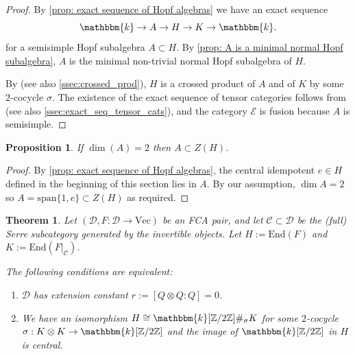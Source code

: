 \documentclass{amsart}
\theoremstyle{plain}%
\newtheorem{thm}[lemma]{Theorem}
\newtheorem{prop}[lemma]{Proposition}
\theoremstyle{remark}
\newcommand{\C}{\mathcal{C}}
\newcommand{\1}{\mathbbm{1}}
\newcommand{\D}{\mathcal{D}}
\newcommand{\E}{\mathcal{E}}
\newcommand{\Z}{\mathbb{Z}}
\newcommand{\End}{\mathrm{End}}
\newcommand{\Vect}{\mathrm{Vec}}
\newcommand{\kk}{\mathbbm{k}}
\newcommand{\pic}{\mathrm{Pic}}
\begin{document}
    \begin{proof}
        By \cref{prop: exact sequence of Hopf algebras} we have an exact sequence 
        $$
            \kk \to A\to H\to K\to \kk.
        $$
        for a semisimple Hopf subalgebra $A\subset H$. By \cref{prop: A is a minimal normal Hopf subalgebra}, $A$ is the minimal non-trivial normal Hopf subalgebra of $H$.
        
        By \cite{Sch} (see also \cref{ssec:crossed_prod}), $H$ is a crossed product of $A$ and of $K$ by some $2$-cocycle $\sigma$. The existence of the exact sequence of tensor categories follows from \cite{BN} (see also \cref{ssec:exact_seq_tensor_cats}), and the category $\E$ is fusion because $A$ is semisimple.
    \end{proof}
    \begin{prop}\label{prop: A is central when dim(A)=2}
        If $\dim(A) = 2$ then $A\subset Z(H)$.
    \end{prop}
    \begin{proof}
        By \cref{prop: exact sequence of Hopf algebras}, the central idempotent $e\in H$ defined in the beginning of this section lies in $A$. By our assumption, $\dim A=2$ so $A = \mathrm{span}\{1,e\}\subset Z(H)$ as required. 
    \end{proof}
    \begin{thm}\label{thm: integral almost semisimple with r=0}
        Let $(\D,F:\D\to \Vect)$ be an FCA pair, and let $\C\subset \D$ be the (full) Serre subcategory generated by the invertible objects. Let $H:=\End(F)$ and $K := \End(F|_{\C})$. %
        
        The following conditions are equivalent:
        \begin{enumerate}
            \item $\D$ has extension constant $r:=[Q\otimes Q:Q]=0$.
            \item We have an isomorphism $H\cong \kk[\Z/2\Z]\#_\sigma K$ for some $2$-cocycle $\sigma:K\otimes K\to \kk[\Z/2\Z]$ and the image of $\kk[\Z/2\Z]$ in $H$ is central.
        \end{enumerate}
    \end{thm}
\end{document}
